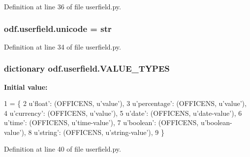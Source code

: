 Definition at line 36 of file userfield.\+py.

\hypertarget{namespaceodf_1_1userfield_acbf030274e249b947b246cb243e604a3}{
\subsubsection[{unicode}]{\setlength{\rightskip}{0pt plus 5cm}odf.\+userfield.\+unicode = str}}\label{namespaceodf_1_1userfield_acbf030274e249b947b246cb243e604a3}


Definition at line 34 of file userfield.\+py.

\hypertarget{namespaceodf_1_1userfield_a9a19426c5bf0ad246a4652644ae83885}{
\subsubsection[{V\+A\+L\+U\+E\+\_\+\+T\+Y\+P\+E\+S}]{\setlength{\rightskip}{0pt plus 5cm}dictionary odf.\+userfield.\+V\+A\+L\+U\+E\+\_\+\+T\+Y\+P\+E\+S}}\label{namespaceodf_1_1userfield_a9a19426c5bf0ad246a4652644ae83885}
{\bfseries Initial value\+:}
\begin{DoxyCode}
1 = \{
2     \textcolor{stringliteral}{u'float'}: (OFFICENS, \textcolor{stringliteral}{u'value'}),
3     \textcolor{stringliteral}{u'percentage'}: (OFFICENS, \textcolor{stringliteral}{u'value'}),
4     \textcolor{stringliteral}{u'currency'}: (OFFICENS, \textcolor{stringliteral}{u'value'}),
5     \textcolor{stringliteral}{u'date'}: (OFFICENS, \textcolor{stringliteral}{u'date-value'}),
6     \textcolor{stringliteral}{u'time'}: (OFFICENS, \textcolor{stringliteral}{u'time-value'}),
7     \textcolor{stringliteral}{u'boolean'}: (OFFICENS, \textcolor{stringliteral}{u'boolean-value'}),
8     \textcolor{stringliteral}{u'string'}: (OFFICENS, \textcolor{stringliteral}{u'string-value'}),
9     \}
\end{DoxyCode}


Definition at line 40 of file userfield.\+py.

